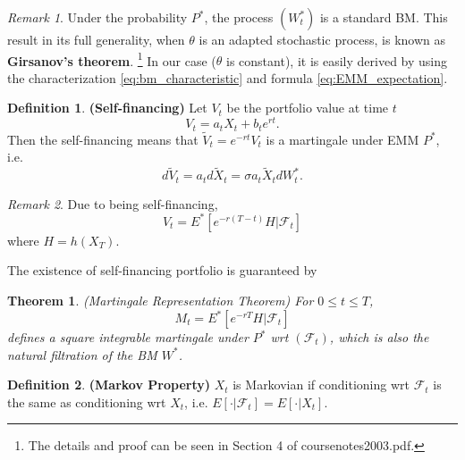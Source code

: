 \documentclass[a4paper,12pt]{article}
\numberwithin{equation}{section}
\newtheorem{theorem}{Theorem}[section]
\theoremstyle{definition}
\newtheorem{definition}{Definition}[section]
\theoremstyle{remark}
\newtheorem{remark}{Remark}[section]
\begin{document}
\begin{remark}\label{Girsanov_TH}
Under the probability $P^{*}$, the process $(W_{t}^{*})$ is a 
standard BM. This result in its full generality, when $\theta$ is 
an adapted stochastic process, is known as \textbf{Girsanov's theorem}.
\footnote{The details and proof can be seen in Section 4 of 
coursenotes2003.pdf.} In our case ($\theta$ is constant), it is 
easily derived by using the characterization 
\eqref{eq:bm_characteristic} and formula \eqref{eq:EMM_expectation}.
\end{remark}

\begin{definition}
\textbf{(Self-financing)} 
Let $V_t$ be the portfolio value at time $t$ 
\begin{equation}
    V_t = a_t X_t + b_t e^{rt}.
\end{equation}
Then the self-financing means that $\widetilde{V}_{t}=e^{-rt}V_{t}$ 
is a martingale under EMM $P^{*}$, i.e. 
\begin{equation}
\label{eq:value_risk_neutral}
    d\widetilde{V}_{t}=a_{t}d\widetilde{X}_{t}
    =\sigma a_{t}\widetilde{X}_{t}dW_{t}^{*}.
\end{equation}
\end{definition}

\begin{remark}
Due to being self-financing, 
\begin{equation}
\label{eq:risk_neutral_valuation}
    V_{t}=E^{*}[e^{-r(T-t)}H|\mathcal{F}_{t}]
\end{equation}
where $H=h(X_T)$.
\end{remark}

The existence of self-financing portfolio is guaranteed by 

\begin{theorem}\label{th:martingale_representation}
    (Martingale Representation Theorem) For $0\leq t\leq T$, 
    \begin{equation}
        M_{t}=E^{*}[e^{-rT}H|\mathcal{F}_{t}]
    \end{equation}
    defines a square integrable martingale under $P^{*}$ wrt 
    $(\mathcal{F}_t)$, which is also the natural filtration of the 
    BM $W^{*}$.
\end{theorem}

\begin{definition}
\textbf{(Markov Property)} 
$X_t$ is Markovian if conditioning wrt $\mathcal{F}_{t}$ is the 
same as conditioning wrt $X_t$, i.e. 
$E[\cdot|\mathcal{F}_{t}]=E[\cdot|X_{t}]$.
\end{definition}
\end{document}
